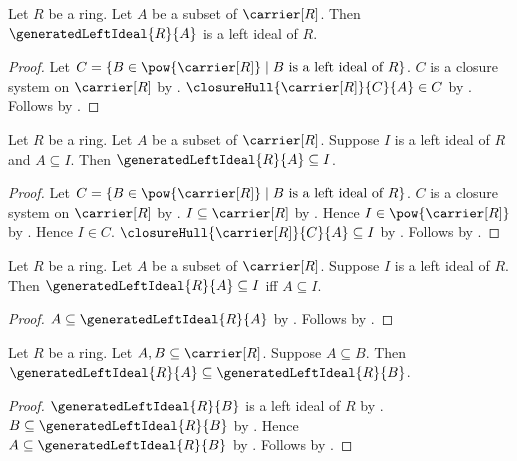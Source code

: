 \begin{theorem}\label{generated_left_ideal_is_left_ideal}
    Let $R$ be a ring.
    Let $A$ be a subset of $\carrier[R]$.
    Then $\generatedLeftIdeal{R}{A}$ is a left ideal of $R$.
\end{theorem}
\begin{proof}
    Let
        $C=\{B\in\pow{\carrier[R]}\mid
            \text{$B$ is a left ideal of $R$}\}$.
    $C$ is a closure system on $\carrier[R]$ by
        .
    $\closureHull{\carrier[R]}{C}{A}\in C$ by
        .
    Follows by .
\end{proof}

\begin{theorem}\label{generated_left_ideal_least}
    Let $R$ be a ring.
    Let $A$ be a subset of $\carrier[R]$.
    Suppose $I$ is a left ideal of $R$ and $A\subseteq I$.
    Then $\generatedLeftIdeal{R}{A}\subseteq I$.
\end{theorem}
\begin{proof}
    Let
        $C=\{B\in\pow{\carrier[R]}\mid
            \text{$B$ is a left ideal of $R$}\}$.
    $C$ is a closure system on $\carrier[R]$ by
        .
    $I\subseteq\carrier[R]$ by .
    Hence $I\in\pow{\carrier[R]}$ by .
    Hence $I\in C$.
    $\closureHull{\carrier[R]}{C}{A}\subseteq I$ by
        .
    Follows by .
\end{proof}

\begin{theorem}\label{generated_left_ideal_universal_property}
    Let $R$ be a ring.
    Let $A$ be a subset of $\carrier[R]$.
    Suppose $I$ is a left ideal of $R$.
    Then $\generatedLeftIdeal{R}{A}\subseteq I$ iff $A\subseteq I$.
\end{theorem}
\begin{proof}
    $A\subseteq\generatedLeftIdeal{R}{A}$ by
        .
    Follows by
        .
\end{proof}

\begin{proposition}\label{generated_left_ideal_monotone}
    Let $R$ be a ring.
    Let $A,B\subseteq\carrier[R]$.
    Suppose $A\subseteq B$.
    Then $\generatedLeftIdeal{R}{A}\subseteq
        \generatedLeftIdeal{R}{B}$.
\end{proposition}
\begin{proof}
    $\generatedLeftIdeal{R}{B}$ is a left ideal of $R$ by
        .
    $B\subseteq\generatedLeftIdeal{R}{B}$ by
        .
    Hence $A\subseteq\generatedLeftIdeal{R}{B}$ by
        .
    Follows by .
\end{proof}

